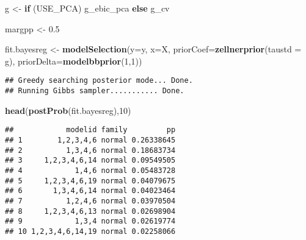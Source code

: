 \documentclass[
]{article}
\newenvironment{Shaded}{\begin{snugshade}}{\end{snugshade}}
\newcommand{\AttributeTok}[1]{\textcolor[rgb]{0.13,0.29,0.53}{#1}}
\newcommand{\ControlFlowTok}[1]{\textcolor[rgb]{0.13,0.29,0.53}{\textbf{#1}}}
\newcommand{\DecValTok}[1]{\textcolor[rgb]{0.00,0.00,0.81}{#1}}
\newcommand{\FloatTok}[1]{\textcolor[rgb]{0.00,0.00,0.81}{#1}}
\newcommand{\FunctionTok}[1]{\textcolor[rgb]{0.13,0.29,0.53}{\textbf{#1}}}
\newcommand{\NormalTok}[1]{#1}
\newcommand{\OtherTok}[1]{\textcolor[rgb]{0.56,0.35,0.01}{#1}}
\begin{document}
\begin{Shaded}
\begin{Highlighting}[]
\NormalTok{g }\OtherTok{\textless{}{-}} \ControlFlowTok{if}\NormalTok{ (USE\_PCA) g\_ebic\_pca }\ControlFlowTok{else}\NormalTok{ g\_cv}

\NormalTok{margpp }\OtherTok{\textless{}{-}} \FloatTok{0.5}
\end{Highlighting}
\end{Shaded}

\begin{Shaded}
\begin{Highlighting}[]
\NormalTok{fit.bayesreg }\OtherTok{\textless{}{-}} \FunctionTok{modelSelection}\NormalTok{(}\AttributeTok{y=}\NormalTok{y, }\AttributeTok{x=}\NormalTok{X, }\AttributeTok{priorCoef=}\FunctionTok{zellnerprior}\NormalTok{(}\AttributeTok{taustd =}\NormalTok{ g), }\AttributeTok{priorDelta=}\FunctionTok{modelbbprior}\NormalTok{(}\DecValTok{1}\NormalTok{,}\DecValTok{1}\NormalTok{))}
\end{Highlighting}
\end{Shaded}

\begin{verbatim}
## Greedy searching posterior mode... Done.
## Running Gibbs sampler........... Done.
\end{verbatim}

\begin{Shaded}
\begin{Highlighting}[]
\FunctionTok{head}\NormalTok{(}\FunctionTok{postProb}\NormalTok{(fit.bayesreg),}\DecValTok{10}\NormalTok{)}
\end{Highlighting}
\end{Shaded}

\begin{verbatim}
##            modelid family         pp
## 1        1,2,3,4,6 normal 0.26338645
## 2          1,3,4,6 normal 0.18683734
## 3     1,2,3,4,6,14 normal 0.09549505
## 4            1,4,6 normal 0.05483728
## 5     1,2,3,4,6,19 normal 0.04079675
## 6       1,3,4,6,14 normal 0.04023464
## 7          1,2,4,6 normal 0.03970504
## 8     1,2,3,4,6,13 normal 0.02698904
## 9            1,3,4 normal 0.02619774
## 10 1,2,3,4,6,14,19 normal 0.02258066
\end{verbatim}
\end{document}
